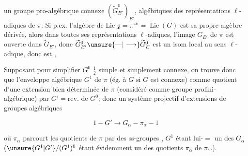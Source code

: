 un  groupe pro-algébrique connexe $(\widetilde G_{E'}^0)_{E'}$,   algébriques des représentations  $\ell$-adiques de $\pi$. Si p.ex. l'algèbre de Lie $\mathfrak g=\pi^{\mathrm{an}}=\operatorname{Lie}(G)$ est sa propre algèbre dérivée, alors dans toutes ses représentations $\ell$-adiques, l'image $G_{E'}$ de $\pi$ est ouverte dans $\widetilde G_{E'}$, donc $\widetilde G_{E'}^0\unsure{\text{---}|\longrightarrow}\widetilde G_E^0$  est un isom local au sens $\ell$-adique, donc  est ,



Supposant pour simplifier $G^0$  $\frac12$ simple et simplement connexe, on trouve donc que l'enveloppe algébrique $G^1$ de $\pi$ (ég. à $G$ si $G$ est connexe)  comme quotient d'une extension bien déterminée de $\pi$ (considéré comme groupe profini-algébrique) par $G'=\mathrm{rev.}$  de $G^0$; donc  un système projectif d'extensions de groupes algébriques


\[
1- G'\longrightarrow G_\alpha-\pi_\alpha-1
\]

où $\pi_\alpha$ parcourt les quotients de $\pi$ par des ss-groupes , $G^1$ étant lui-$=$ un des $G_\alpha$ \deleted{\unsure{$\Gamma$}} ($\unsure{G^1|G'}/(G^1)^0$ étant évidemment un des quotients $\pi_\alpha$ de $\pi$\ldots).

